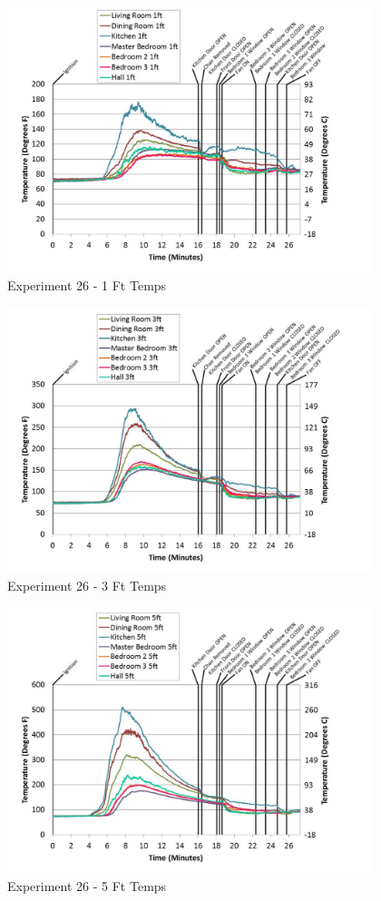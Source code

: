 \documentclass{article}
\begin{document}
\begin{appendices}
	\begin{figure}[h!]
		\centering
		\includegraphics[height=3.05in]{0_Images/Results_Charts/Exp_26_Charts/1FtTemps.pdf}
		\caption{Experiment 26 - 1 Ft Temps}
	\end{figure}
 

	\begin{figure}[h!]
		\centering
		\includegraphics[height=3.05in]{0_Images/Results_Charts/Exp_26_Charts/3FtTemps.pdf}
		\caption{Experiment 26 - 3 Ft Temps}
	\end{figure}
 
	\clearpage

	\begin{figure}[h!]
		\centering
		\includegraphics[height=3.05in]{0_Images/Results_Charts/Exp_26_Charts/5FtTemps.pdf}
		\caption{Experiment 26 - 5 Ft Temps}
	\end{figure}
 


\end{appendices}
\end{document}
